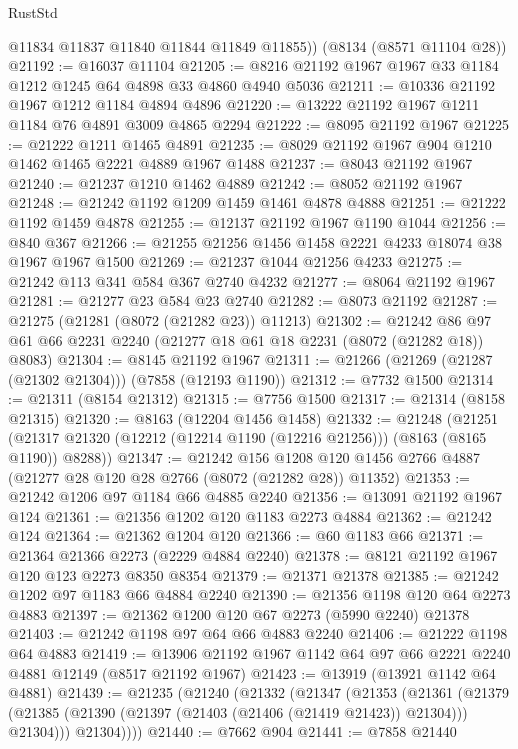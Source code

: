 \begin{lexlean}{RustStd}
\begin{coremodule}
        @11834
        @11837
        @11840
        @11844
        @11849
        @11855))
    (@8134 (@8571 @11104 @28))
@21192 := @16037 @11104
@21205 := @8216 @21192 @1967 @1967 @33 @1184 @1212 @1245 @64 @4898 @33 @4860 @4940 @5036
@21211 := @10336 @21192 @1967 @1212 @1184 @4894 @4896
@21220 := @13222 @21192 @1967 @1211 @1184 @76 @4891 @3009 @4865 @2294
@21222 := @8095 @21192 @1967
@21225 := @21222 @1211 @1465 @4891
@21235 := @8029 @21192 @1967 @904 @1210 @1462 @1465 @2221 @4889 @1967 @1488
@21237 := @8043 @21192 @1967
@21240 := @21237 @1210 @1462 @4889
@21242 := @8052 @21192 @1967
@21248 := @21242 @1192 @1209 @1459 @1461 @4878 @4888
@21251 := @21222 @1192 @1459 @4878
@21255 := @12137 @21192 @1967 @1190 @1044
@21256 := @840 @367
@21266 := @21255 @21256 @1456 @1458 @2221 @4233 @18074 @38 @1967 @1967 @1500
@21269 := @21237 @1044 @21256 @4233
@21275 := @21242 @113 @341 @584 @367 @2740 @4232
@21277 := @8064 @21192 @1967
@21281 := @21277 @23 @584 @23 @2740
@21282 := @8073 @21192
@21287 := @21275 (@21281 (@8072 (@21282 @23)) @11213)
@21302 := @21242 @86 @97 @61 @66 @2231 @2240 (@21277 @18 @61 @18 @2231 (@8072 (@21282 @18)) @8083)
@21304 := @8145 @21192 @1967
@21311 := @21266 (@21269 (@21287 (@21302 @21304))) (@7858 (@12193 @1190))
@21312 := @7732 @1500
@21314 := @21311 (@8154 @21312)
@21315 := @7756 @1500
@21317 := @21314 (@8158 @21315)
@21320 := @8163 (@12204 @1456 @1458)
@21332 := @21248
    (@21251 (@21317 @21320 (@12212 (@12214 @1190 (@12216 @21256))) (@8163 (@8165 @1190)) @8288))
@21347 := @21242
    @156
    @1208
    @120
    @1456
    @2766
    @4887
    (@21277 @28 @120 @28 @2766 (@8072 (@21282 @28)) @11352)
@21353 := @21242 @1206 @97 @1184 @66 @4885 @2240
@21356 := @13091 @21192 @1967 @124
@21361 := @21356 @1202 @120 @1183 @2273 @4884
@21362 := @21242 @124
@21364 := @21362 @1204 @120
@21366 := @60 @1183 @66
@21371 := @21364 @21366 @2273 (@2229 @4884 @2240)
@21378 := @8121 @21192 @1967 @120 @123 @2273 @8350 @8354
@21379 := @21371 @21378
@21385 := @21242 @1202 @97 @1183 @66 @4884 @2240
@21390 := @21356 @1198 @120 @64 @2273 @4883
@21397 := @21362 @1200 @120 @67 @2273 (@5990 @2240) @21378
@21403 := @21242 @1198 @97 @64 @66 @4883 @2240
@21406 := @21222 @1198 @64 @4883
@21419 := @13906 @21192 @1967 @1142 @64 @97 @66 @2221 @2240 @4881 @12149 (@8517 @21192 @1967)
@21423 := @13919 (@13921 @1142 @64 @4881)
@21439 := @21235
    (@21240
      (@21332
        (@21347
          (@21353
            (@21361
              (@21379 (@21385 (@21390 (@21397 (@21403 (@21406 (@21419 @21423)) @21304))) @21304)))
            @21304))))
@21440 := @7662 @904
@21441 := @7858 @21440

\end{coremodule}
\end{lexlean}
